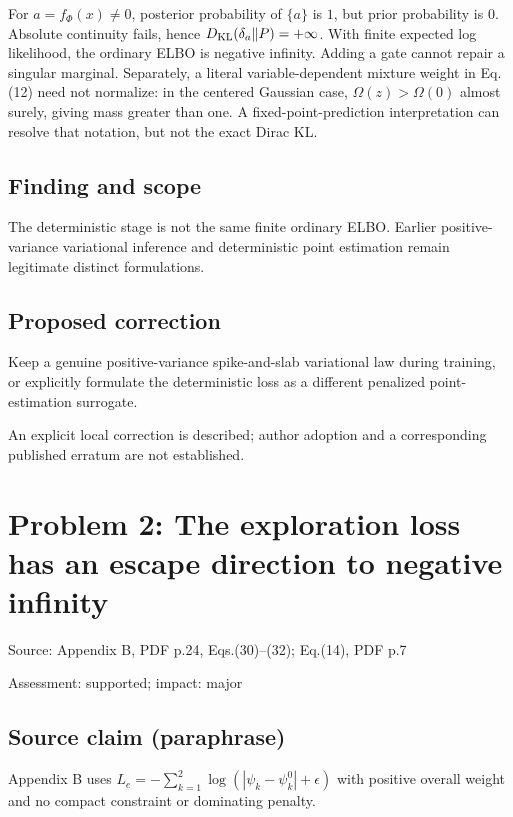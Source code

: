 \documentclass[11pt]{article}
\begin{document}
For \(a=f_\Phi(x)\ne0\), posterior probability of \(\{a\}\) is \(1\), but prior probability is \(0\). Absolute continuity fails, hence \(D_{\rm KL}(\delta_a\Vert P)=+\infty\). With finite expected log likelihood, the ordinary ELBO is negative infinity. Adding a gate cannot repair a singular marginal. Separately, a literal variable-dependent mixture weight in Eq.(12) need not normalize: in the centered Gaussian case, \(\Omega(z)>\Omega(0)\) almost surely, giving mass greater than one. A fixed-point-prediction interpretation can resolve that notation, but not the exact Dirac KL.

\subsection*{Finding and scope}

The deterministic stage is not the same finite ordinary ELBO. Earlier positive-variance variational inference and deterministic point estimation remain legitimate distinct formulations.

\subsection*{Proposed correction}

Keep a genuine positive-variance spike-and-slab variational law during training, or explicitly formulate the deterministic loss as a different penalized point-estimation surrogate.

An explicit local correction is described; author adoption and a corresponding published erratum are not established.

\section*{Problem 2: The exploration loss has an escape direction to negative infinity}

Source: Appendix B, PDF p.24, Eqs.(30)–(32); Eq.(14), PDF p.7

Assessment: supported; impact: major

\subsection*{Source claim (paraphrase)}

Appendix B uses \(L_e=-\sum_{k=1}^2\log(|\psi_k-\psi_k^0|+\epsilon)\) with positive overall weight and no compact constraint or dominating penalty.
\end{document}

